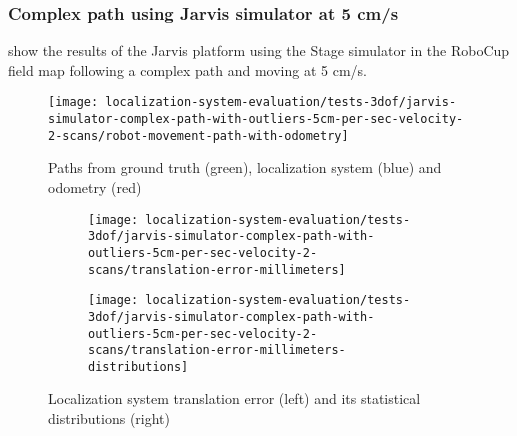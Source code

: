 \subsubsection{Complex path using Jarvis simulator at 5 cm/s}

 show the results of the Jarvis platform using the Stage simulator in the RoboCup field map following a complex path and moving at 5 cm/s.

\begin{figure}[H]
	\centering
	\texttt{[image: localization-system-evaluation/tests-3dof/jarvis-simulator-complex-path-with-outliers-5cm-per-sec-velocity-2-scans/robot-movement-path-with-odometry]}
	\caption{Paths from ground truth (green), localization system (blue) and odometry (red)}
	\label{fig:localization-system-evaluation_jarvis-simulator-complex-path-with-outliers-5cm-per-sec-velocity-2-scans}
\end{figure}

\begin{figure}[H]
	\centering
	\begin{subfigure}[h]{0.47\textwidth}
		\centering
		\texttt{[image: localization-system-evaluation/tests-3dof/jarvis-simulator-complex-path-with-outliers-5cm-per-sec-velocity-2-scans/translation-error-millimeters]}
	\end{subfigure}
	\begin{subfigure}[h]{0.47\textwidth}
		\centering
		\texttt{[image: localization-system-evaluation/tests-3dof/jarvis-simulator-complex-path-with-outliers-5cm-per-sec-velocity-2-scans/translation-error-millimeters-distributions]}
	\end{subfigure}
	\caption{Localization system translation error (left) and its statistical distributions (right)}
	\label{fig:localization-system-evaluation_jarvis-simulator-complex-path-with-outliers-5cm-per-sec-velocity-2-scans_translation-errors}
\end{figure}

